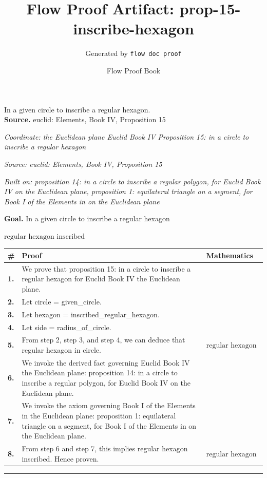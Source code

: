 \documentclass[11pt]{article}
\title{Flow Proof Artifact: prop-15-inscribe-hexagon}
\author{Generated by \texttt{flow doc proof}}
\date{Flow Proof Book}
\theoremstyle{definition}
\begin{document}
\maketitle
In a given circle to inscribe a regular hexagon.\\[0.5em]
\textbf{Source.} euclid: Elements, Book IV, Proposition 15\\[0.5em]
\bigskip
{}\par
\smallskip\noindent\textit{Coordinate: the Euclidean plane \cdot Euclid Book IV \cdot Proposition 15: in a circle to inscribe a regular hexagon}\par
\smallskip\noindent\textit{Source: euclid: Elements, Book IV, Proposition 15}\par
\smallskip\noindent\textit{Built on: proposition 14: in a circle to inscribe a regular polygon, for Euclid Book IV on the Euclidean plane, proposition 1: equilateral triangle on a segment, for Book I of the Elements in on the Euclidean plane}\par
\medskip
\noindent\textbf{Goal.} In a given circle to inscribe a regular hexagon\par
\noindent$\displaystyle \text{regular hexagon inscribed}$\par
\medskip
\noindent
\begin{tabular}{@{} >{\raggedright\arraybackslash}p{} >{\raggedright\arraybackslash}p{} >{\raggedleft\arraybackslash}p{} @{}}
\textbf{\#} & \textbf{Proof} & \textbf{Mathematics} \\
\midrule
\textbf{1.} & We prove that proposition 15: in a circle to inscribe a regular hexagon for Euclid Book IV the Euclidean plane. & \\[0.45em]
\textbf{2.} & Let circle = given\_circle. & \\[0.45em]
\textbf{3.} & Let hexagon = inscribed\_regular\_hexagon. & \\[0.45em]
\textbf{4.} & Let side = radius\_of\_circle. & \\[0.45em]
\textbf{5.} & From step 2, step 3, and step 4, we can deduce that regular hexagon in circle. & $\displaystyle \text{regular hexagon in circle}$ \\[0.45em]
\textbf{6.} & We invoke the derived fact governing Euclid Book IV the Euclidean plane: proposition 14: in a circle to inscribe a regular polygon, for Euclid Book IV on the Euclidean plane. & \\[0.45em]
\textbf{7.} & We invoke the axiom governing Book I of the Elements in the Euclidean plane: proposition 1: equilateral triangle on a segment, for Book I of the Elements in on the Euclidean plane. & \\[0.45em]
\textbf{8.} & From step 6 and step 7, this implies regular hexagon inscribed. Hence proven. & $\displaystyle \text{regular hexagon inscribed}$ \\[0.45em]
\bottomrule
\end{tabular}
\label{thm:Geometry-Euclid Book IV-proposition_15_in_a_circle_to_inscribe_a_regular_hexagon}
\par\medskip\hrule
\end{document}
